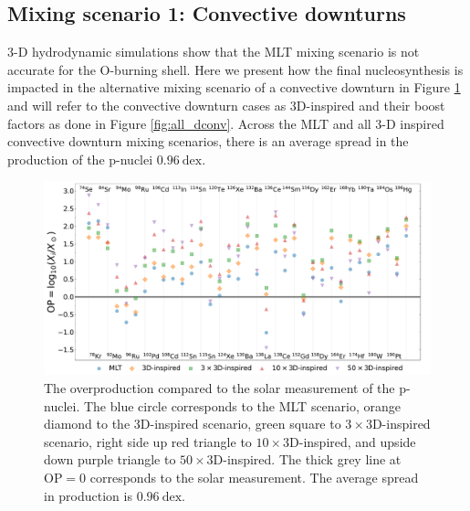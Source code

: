 \subsection{Mixing scenario 1: Convective downturns}\label{sec:convdownturnimpact}

3-D hydrodynamic simulations show that the MLT mixing scenario is not accurate for the O-burning shell.
Here we present how the final nucleosynthesis is impacted in the alternative mixing scenario of a convective downturn \citep{jonesIdealizedHydrodynamicSimulations2017} in Figure \ref{fig:impactmixingcases} and will refer to the convective downturn cases as 3D-inspired and their boost factors as done in Figure \ref{fig:all_dconv}.
Across the MLT and all 3-D inspired convective downturn mixing scenarios, there is an average spread in the production of the p-nuclei $0.96~\mathrm{dex}$.

\begin{figure}[!hbt]
\includegraphics[width=\textwidth]{chapters/2/figures/impact_mixing_cases.pdf}
\caption{The overproduction compared to the solar measurement of the p-nuclei. The blue circle corresponds to the MLT scenario, orange diamond to the 3D-inspired scenario, green square to $3\times$3D-inspired scenario, right side up red triangle to $10\times $3D-inspired, and upside down purple triangle to $50\times$3D-inspired. The thick grey line at $\mathrm{OP}= 0$ corresponds to the solar measurement. The average spread in production is $0.96~\mathrm{dex}$.
\label{fig:impactmixingcases}}
\end{figure}

